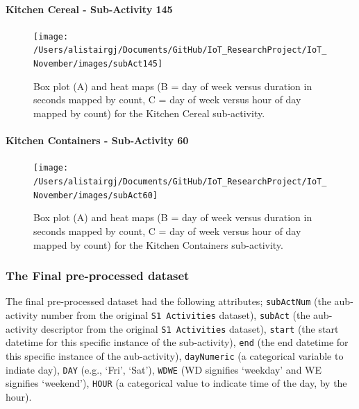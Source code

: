 \documentclass[11pt,]{article}
\let\oldparagraph\paragraph
\renewcommand{\paragraph}[1]{\oldparagraph{#1}\mbox{}}
\begin{document}
\hypertarget{kitchen-cereal---sub-activity-145}{%
\paragraph{Kitchen Cereal - Sub-Activity
145}\label{kitchen-cereal---sub-activity-145}}

\begin{figure}[H]

{\centering \texttt{[image: /Users/alistairgj/Documents/GitHub/IoT\_ResearchProject/IoT\_November/images/subAct145]} 

}

\caption{Box plot (A) and heat maps (B = day of week versus duration in seconds mapped by count, C = day of week versus hour of day mapped by count) for the Kitchen Cereal sub-activity.}\label{fig:subAct145}
\end{figure}

\hypertarget{kitchen-containers---sub-activity-60}{%
\paragraph{Kitchen Containers - Sub-Activity
60}\label{kitchen-containers---sub-activity-60}}

\begin{figure}[H]

{\centering \texttt{[image: /Users/alistairgj/Documents/GitHub/IoT\_ResearchProject/IoT\_November/images/subAct60]} 

}

\caption{Box plot (A) and heat maps (B = day of week versus duration in seconds mapped by count, C = day of week versus hour of day mapped by count) for the Kitchen Containers sub-activity.}\label{fig:subAct60}
\end{figure}

\hypertarget{the-final-pre-processed-dataset}{%
\subsubsection{The Final pre-processed
dataset}\label{the-final-pre-processed-dataset}}

The final pre-processed dataset had the following attributes;
\texttt{subActNum} (the aub-activity number from the original
\texttt{S1\ Activities} dataset), \texttt{subAct} (the aub-activity
descriptor from the original \texttt{S1\ Activities} dataset),
\texttt{start} (the start datetime for this specific instance of the
sub-activity), \texttt{end} (the end datetime for this specific instance
of the aub-activity), \texttt{dayNumeric} (a categorical variable to
indiate day), \texttt{DAY} (e.g., `Fri', `Sat'), \texttt{WDWE} (WD
signifies `weekday' and WE signifies `weekend'), \texttt{HOUR} (a
categorical value to indicate time of the day, by the hour).
\end{document}
